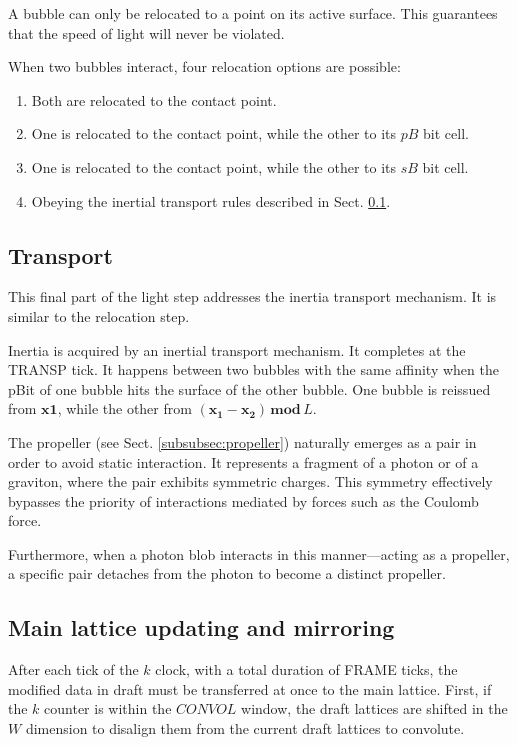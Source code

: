 \documentclass[12pt,english]{article}
\begin{document}
A bubble can only be relocated to a point on its active surface. This guarantees that the speed of light will never be violated. 

When two bubbles interact, four relocation options are possible:

\begin{enumerate}
\item Both are relocated to the contact point.
    \item One is relocated to the contact point, while the other to its $pB$ bit cell.
    \item One is relocated to the contact point, while the other to its $sB$ bit cell.
    \item Obeying the inertial transport rules described in Sect. \ref{subsec:transport}.
\end{enumerate}

\subsection{Transport} \label{subsec:transport}
This final part of the light step addresses the inertia transport mechanism. It is similar to the relocation step.

Inertia is acquired by an inertial transport mechanism. It completes at the TRANSP tick. It happens between two bubbles with the same affinity when the pBit of one bubble hits the surface of the other bubble. One bubble is reissued from $\boldsymbol{x1}$, while the other from $(\boldsymbol{x_1}-\boldsymbol{x_2})\,\boldsymbol{mod}\,L$.

The propeller (see Sect. \ref{subsubsec:propeller}) naturally emerges as a pair in order to avoid static interaction. It represents a fragment of a photon or of a graviton, where the pair exhibits symmetric charges. This symmetry effectively bypasses the priority of interactions mediated by forces such as the Coulomb force. 

Furthermore, when a photon blob interacts in this manner—acting as a propeller, a specific pair detaches from the photon to become a distinct propeller.


\subsection{Main lattice updating and mirroring} \label{subsec:updating}
After each tick of the $k$ clock, with a total duration of FRAME ticks, the modified data in draft must be transferred at once to the main lattice. First, if the $k$ counter is within the $CONVOL$ window, the draft lattices are shifted in the $W$ dimension to disalign them from the current draft lattices to convolute.
\end{document}
